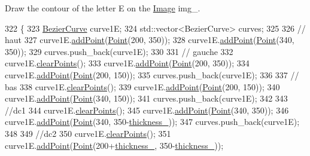 Draw the contour of the letter E on the \mbox{\hyperlink{class_image}{Image}} img\+\_\+. 


\begin{DoxyCode}
322               \{
323     \mbox{\hyperlink{class_bezier_curve}{BezierCurve}} curve1E;
324     std::vector<BezierCurve> curves;
325 
326     \textcolor{comment}{// haut}
327     curve1E.\mbox{\hyperlink{class_bezier_curve_a38d16c18b36ae45619b05e26e226cf34}{addPoint}}(\mbox{\hyperlink{class_point}{Point}}(200, 350));
328     curve1E.\mbox{\hyperlink{class_bezier_curve_a38d16c18b36ae45619b05e26e226cf34}{addPoint}}(\mbox{\hyperlink{class_point}{Point}}(340, 350));
329     curves.push\_back(curve1E);
330 
331     \textcolor{comment}{// gauche}
332     curve1E.\mbox{\hyperlink{class_bezier_curve_a0ba8ce66d5af5971ae6a1b506029728e}{clearPoints}}();
333     curve1E.\mbox{\hyperlink{class_bezier_curve_a38d16c18b36ae45619b05e26e226cf34}{addPoint}}(\mbox{\hyperlink{class_point}{Point}}(200, 350));
334     curve1E.\mbox{\hyperlink{class_bezier_curve_a38d16c18b36ae45619b05e26e226cf34}{addPoint}}(\mbox{\hyperlink{class_point}{Point}}(200, 150));
335     curves.push\_back(curve1E);
336 
337     \textcolor{comment}{// bas}
338     curve1E.\mbox{\hyperlink{class_bezier_curve_a0ba8ce66d5af5971ae6a1b506029728e}{clearPoints}}();
339     curve1E.\mbox{\hyperlink{class_bezier_curve_a38d16c18b36ae45619b05e26e226cf34}{addPoint}}(\mbox{\hyperlink{class_point}{Point}}(200, 150));
340     curve1E.\mbox{\hyperlink{class_bezier_curve_a38d16c18b36ae45619b05e26e226cf34}{addPoint}}(\mbox{\hyperlink{class_point}{Point}}(340, 150));
341     curves.push\_back(curve1E);
342 
343     \textcolor{comment}{//dc1}
344     curve1E.\mbox{\hyperlink{class_bezier_curve_a0ba8ce66d5af5971ae6a1b506029728e}{clearPoints}}();
345     curve1E.\mbox{\hyperlink{class_bezier_curve_a38d16c18b36ae45619b05e26e226cf34}{addPoint}}(\mbox{\hyperlink{class_point}{Point}}(340, 350));
346     curve1E.\mbox{\hyperlink{class_bezier_curve_a38d16c18b36ae45619b05e26e226cf34}{addPoint}}(\mbox{\hyperlink{class_point}{Point}}(340, 350-\mbox{\hyperlink{class_font_v1_aed8040e76be9a52833627b92f0fb4e5f}{thickness\_}}));
347     curves.push\_back(curve1E);
348 
349     \textcolor{comment}{//dc2}
350     curve1E.\mbox{\hyperlink{class_bezier_curve_a0ba8ce66d5af5971ae6a1b506029728e}{clearPoints}}();
351     curve1E.\mbox{\hyperlink{class_bezier_curve_a38d16c18b36ae45619b05e26e226cf34}{addPoint}}(\mbox{\hyperlink{class_point}{Point}}(200+\mbox{\hyperlink{class_font_v1_aed8040e76be9a52833627b92f0fb4e5f}{thickness\_}}, 350-\mbox{\hyperlink{class_font_v1_aed8040e76be9a52833627b92f0fb4e5f}{thickness\_}}));

\end{DoxyCode}
